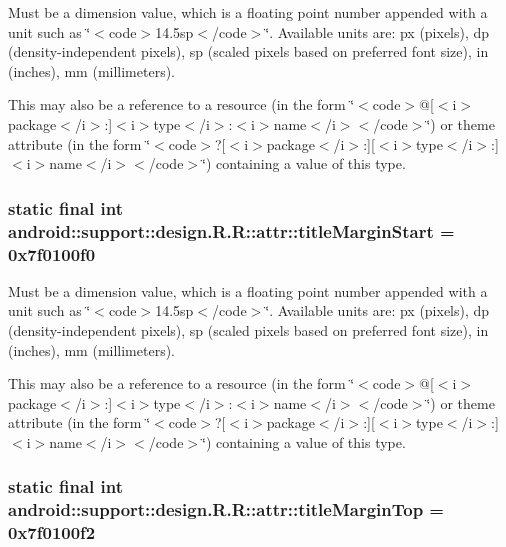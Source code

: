 Must be a dimension value, which is a floating point number appended with a unit such as \char`\"{}$<$code$>$14.5sp$<$/code$>$\char`\"{}. Available units are: px (pixels), dp (density-independent pixels), sp (scaled pixels based on preferred font size), in (inches), mm (millimeters). 

This may also be a reference to a resource (in the form \char`\"{}$<$code$>$@\mbox{[}$<$i$>$package$<$/i$>$:\mbox{]}$<$i$>$type$<$/i$>$:$<$i$>$name$<$/i$>$$<$/code$>$\char`\"{}) or theme attribute (in the form \char`\"{}$<$code$>$?\mbox{[}$<$i$>$package$<$/i$>$:\mbox{]}\mbox{[}$<$i$>$type$<$/i$>$:\mbox{]}$<$i$>$name$<$/i$>$$<$/code$>$\char`\"{}) containing a value of this type. \hypertarget{classandroid_1_1support_1_1design_1_1_r_1_1attr_752930be54dcc0bfd548da149bffbdf3}{
\subsubsection[{titleMarginStart}]{\setlength{\rightskip}{0pt plus 5cm}static final int android::support::design.R.R::attr::titleMarginStart = 0x7f0100f0}}
\label{classandroid_1_1support_1_1design_1_1_r_1_1attr_752930be54dcc0bfd548da149bffbdf3}


Must be a dimension value, which is a floating point number appended with a unit such as \char`\"{}$<$code$>$14.5sp$<$/code$>$\char`\"{}. Available units are: px (pixels), dp (density-independent pixels), sp (scaled pixels based on preferred font size), in (inches), mm (millimeters). 

This may also be a reference to a resource (in the form \char`\"{}$<$code$>$@\mbox{[}$<$i$>$package$<$/i$>$:\mbox{]}$<$i$>$type$<$/i$>$:$<$i$>$name$<$/i$>$$<$/code$>$\char`\"{}) or theme attribute (in the form \char`\"{}$<$code$>$?\mbox{[}$<$i$>$package$<$/i$>$:\mbox{]}\mbox{[}$<$i$>$type$<$/i$>$:\mbox{]}$<$i$>$name$<$/i$>$$<$/code$>$\char`\"{}) containing a value of this type. \hypertarget{classandroid_1_1support_1_1design_1_1_r_1_1attr_3bdb69cf3f9cbd94cf2f876dc939a614}{
\subsubsection[{titleMarginTop}]{\setlength{\rightskip}{0pt plus 5cm}static final int android::support::design.R.R::attr::titleMarginTop = 0x7f0100f2}}
\label{classandroid_1_1support_1_1design_1_1_r_1_1attr_3bdb69cf3f9cbd94cf2f876dc939a614}


